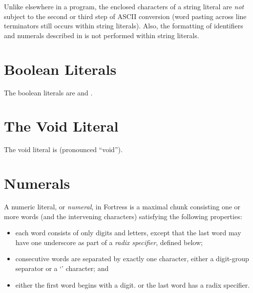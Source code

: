 Unlike elsewhere in a program,
the enclosed characters of a string literal
are \emph{not} subject to the second or third step of ASCII conversion
(word pasting across line terminators
still occurs within string literals).
Also, the formatting of identifiers and numerals
described in 
is not performed within string literals.


\section{Boolean Literals}
The boolean literals are  and .

\section{The Void Literal}
The void literal is \EXP{()} (pronounced ``void'').

\section{Numerals}

A numeric literal,
or \emph{numeral},
in Fortress is a maximal chunk
consisting one or more words
(and the intervening characters)
satisfying the following properties:
\begin{itemize}

\item
each word consists of only digits and letters,
except that the last word may have one underscore
as part of a \emph{radix specifier},
defined below;

\item
consecutive words are separated by exactly one character,
either a digit-group separator or
 a `' character;
and

\item
either
the first word begins with a digit.
or the last word has a radix specifier.

\end{itemize}

